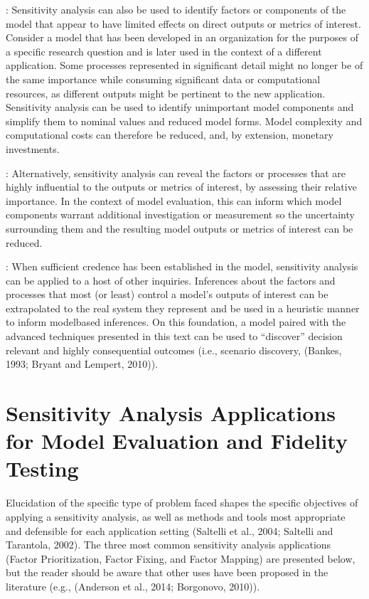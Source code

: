 \documentclass[letterpaper,10pt,english]{sphinxmanual}
\begin{document}
\sphinxAtStartPar
{}: Sensitivity analysis can also be used to identify factors or components of the model that appear to have limited effects on direct outputs or metrics of interest. Consider a model that has been developed in an organization for the purposes of a specific research question and is later used in the context of a different application. Some processes represented in significant detail might no longer be of the same importance while consuming significant data or computational resources, as different outputs might be pertinent to the new application. Sensitivity analysis can be used to identify unimportant model components and simplify them to nominal values and reduced model forms. Model complexity and computational costs can therefore be reduced, and, by extension, monetary investments.

\sphinxAtStartPar
{}: Alternatively, sensitivity analysis can reveal the factors or processes that are highly influential to the outputs or metrics of interest, by assessing their relative importance. In the context of model evaluation, this can inform which model components warrant additional investigation or measurement so the uncertainty surrounding them and the resulting model outputs or metrics of interest can be reduced.

\sphinxAtStartPar
{}: When sufficient credence has been established in the model, sensitivity analysis can be applied to a host of other inquiries. Inferences about the factors and processes that most (or least) control a model’s outputs of interest can be extrapolated to the real system they represent and be used in a heuristic manner to inform model\sphinxhyphen{}based inferences. On this foundation, a model paired with the advanced techniques presented in this text can be used to “discover” decision relevant and highly consequential outcomes (i.e., scenario discovery, (Bankes, 1993; Bryant and Lempert, 2010)).


\section{Sensitivity Analysis Applications for Model Evaluation and Fidelity Testing}
\label{\detokenize{3_sensitivity_analysis_the_basics:sensitivity-analysis-applications-for-model-evaluation-and-fidelity-testing}}
\sphinxAtStartPar
Elucidation of the specific type of problem faced shapes the specific objectives of applying a sensitivity analysis, as well as methods and tools most appropriate and defensible for each application setting (Saltelli et al., 2004; Saltelli and Tarantola, 2002). The three most common sensitivity analysis applications (Factor Prioritization, Factor Fixing, and Factor Mapping) are presented below, but the reader should be aware that other uses have been proposed in the literature (e.g., (Anderson et al., 2014; Borgonovo, 2010)).
\end{document}
